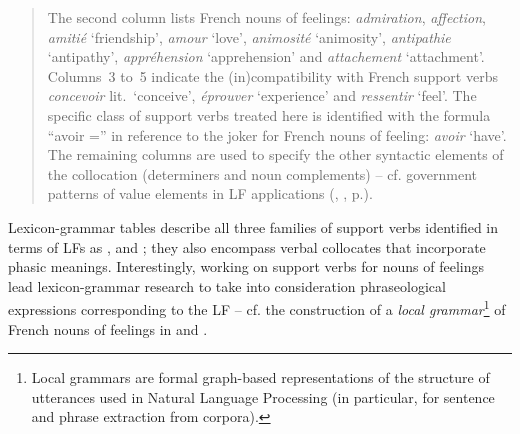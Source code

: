 \begin{quote}
The second column lists French nouns of feelings: \textit{admiration}, \textit{affection}, \textit{amitié} `friendship', \textit{amour} `love', \textit{animosité} `animosity', \textit{antipathie} `antipathy', \textit{appréhension} `apprehension' and \textit{attachement} `attachment'. Columns~3 to~5 indicate the (in)compatibility with French support verbs \textit{concevoir} lit.~`conceive', \textit{éprouver} `experience' and \textit{ressentir} `feel'. The specific class of support verbs treated here is identified with the formula ``\textsf{avoir =}'' in reference to the joker  for French nouns of feeling: \textit{avoir} `have'. The remaining columns are used to specify the other syntactic elements of the collocation (determiners and noun complements) -- cf. government patterns of value elements in LF applications (, , p.\thinspace\pageref{par:valueGP}).
\end{quote}

Lexicon-grammar tables describe all three families of support verbs identified in terms of LFs as ,  and ; they also encompass verbal collocates that incorporate phasic meanings. Interestingly, working on support verbs for nouns of feelings lead lexicon-grammar research to take into consideration phraseological expressions corresponding to the  LF -- cf. the construction of a \emph{local grammar}\footnote{Local grammars are formal graph-based representations of the structure of utterances used in Natural Language Processing (in particular, for sentence and phrase extraction from corpora).} of French nouns of feelings in \textcite[Sec.~4.2]{GrossM1988a} and \textcite[Sec.~5]{GrossM1995}.

